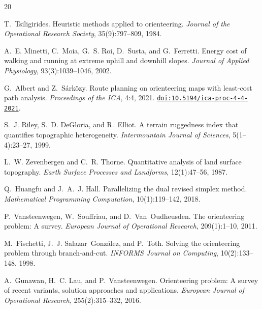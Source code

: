 \documentclass[11pt,a4paper]{article}
\providecommand{\doi}[1]{\href{https://doi.org/#1}{\texttt{doi:#1}}}
\begin{document}
\begin{thebibliography}{20}

T.~Tsiligirides.
\newblock Heuristic methods applied to orienteering.
\newblock \emph{Journal of the Operational Research Society}, 35(9):797--809, 1984.

A.~E. Minetti, C.~Moia, G.~S. Roi, D.~Susta, and G.~Ferretti.
\newblock Energy cost of walking and running at extreme uphill and downhill slopes.
\newblock \emph{Journal of Applied Physiology}, 93(3):1039--1046, 2002.

G.~Albert and Z.~S\'{a}rk\"{o}zy.
\newblock Route planning on orienteering maps with least-cost path analysis.
\newblock \emph{Proceedings of the ICA}, 4:4, 2021.
\newblock \doi{10.5194/ica-proc-4-4-2021}.

S.~J. Riley, S.~D. DeGloria, and R.~Elliot.
\newblock A terrain ruggedness index that quantifies topographic heterogeneity.
\newblock \emph{Intermountain Journal of Sciences}, 5(1--4):23--27, 1999.

L.~W. Zevenbergen and C.~R. Thorne.
\newblock Quantitative analysis of land surface topography.
\newblock \emph{Earth Surface Processes and Landforms}, 12(1):47--56, 1987.

Q.~Huangfu and J.~A.~J. Hall.
\newblock Parallelizing the dual revised simplex method.
\newblock \emph{Mathematical Programming Computation}, 10(1):119--142, 2018.

P.~Vansteenwegen, W.~Souffriau, and D.~Van~Oudheusden.
\newblock The orienteering problem: A survey.
\newblock \emph{European Journal of Operational Research}, 209(1):1--10, 2011.

M.~Fischetti, J.~J. Salazar~Gonz\'{a}lez, and P.~Toth.
\newblock Solving the orienteering problem through branch-and-cut.
\newblock \emph{INFORMS Journal on Computing}, 10(2):133--148, 1998.

A.~Gunawan, H.~C. Lau, and P.~Vansteenwegen.
\newblock Orienteering problem: A survey of recent variants, solution approaches and applications.
\newblock \emph{European Journal of Operational Research}, 255(2):315--332, 2016.


\end{thebibliography}
\end{document}
